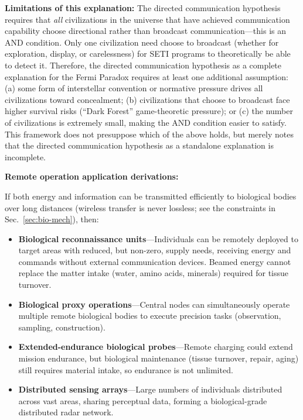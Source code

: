 \documentclass[aps,prd,twocolumn,superscriptaddress,nofootinbib]{revtex4-2}
\begin{document}
\textbf{Limitations of this explanation:} The directed communication hypothesis requires that \emph{all} civilizations in the universe that have achieved communication capability choose directional rather than broadcast communication---this is an AND condition. Only one civilization need choose to broadcast (whether for exploration, display, or carelessness) for SETI programs to theoretically be able to detect it. Therefore, the directed communication hypothesis as a complete explanation for the Fermi Paradox requires at least one additional assumption: (a) some form of interstellar convention or normative pressure drives all civilizations toward concealment; (b) civilizations that choose to broadcast face higher survival risks (``Dark Forest'' game-theoretic pressure); or (c) the number of civilizations is extremely small, making the AND condition easier to satisfy. This framework does not presuppose which of the above holds, but merely notes that the directed communication hypothesis as a standalone explanation is incomplete.

\textbf{Remote operation application derivations:}

If both energy and information can be transmitted efficiently to biological bodies over long distances (wireless transfer is never lossless; see the constraints in Sec.~\ref{sec:bio-mech}), then:

\begin{itemize}
  \item \textbf{Biological reconnaissance units}---Individuals can be remotely deployed to target areas with reduced, but non-zero, supply needs, receiving energy and commands without external communication devices. Beamed energy cannot replace the matter intake (water, amino acids, minerals) required for tissue turnover.
  \item \textbf{Biological proxy operations}---Central nodes can simultaneously operate multiple remote biological bodies to execute precision tasks (observation, sampling, construction).
  \item \textbf{Extended-endurance biological probes}---Remote charging could extend mission endurance, but biological maintenance (tissue turnover, repair, aging) still requires material intake, so endurance is not unlimited.
  \item \textbf{Distributed sensing arrays}---Large numbers of individuals distributed across vast areas, sharing perceptual data, forming a biological-grade distributed radar network.
\end{itemize}
\end{document}
